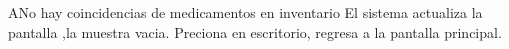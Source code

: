 	\begin{UCtrayectoriaA}{A}{No hay coincidencias de medicamentos en inventario}
			\UCpaso El sistema actualiza la pantalla ,la muestra vacia.
		    \UCpaso [\UCactor] Preciona en escritorio, regresa a la pantalla principal.
		\end{UCtrayectoriaA}
